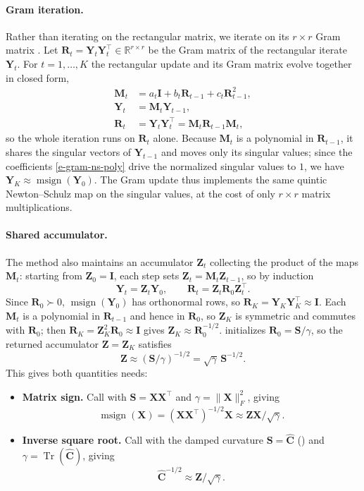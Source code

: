 \documentclass{article}
\newcommand{\mat}[1]{\bm{#1}}
\DeclareMathOperator{\Tr}{Tr}
\DeclareMathOperator{\msign}{msign}          %
\newcommand{\norm}[1]{\| #1\|}
\begin{document}
\paragraph{Gram iteration.}
Rather than iterating on the rectangular matrix, we iterate on its $r\times r$
Gram matrix \cite{gram_ns}.  Let $\mat{R}_t = \mat{Y}_t \mat{Y}_t^\top \in \mathbb{R}^{r\times r}$
be the Gram matrix of the rectangular iterate $\mat{Y}_t$.  For $t=1,\dots,K$ the
rectangular update and its Gram matrix evolve together in closed form,
\[
\begin{aligned}
    \mat{M}_t &= a_t \mat{I} + b_t \mat{R}_{t-1} + c_t \mat{R}_{t-1}^2, \\
    \mat{Y}_t &= \mat{M}_t \mat{Y}_{t-1}, \\
    \mat{R}_t &= \mat{Y}_t\mat{Y}_t^\top = \mat{M}_t \mat{R}_{t-1} \mat{M}_t ,
\end{aligned}
\]
so the whole iteration runs on $\mat{R}_t$ alone.  Because $\mat{M}_t$ is a polynomial in
$\mat{R}_{t-1}$, it shares the singular vectors of $\mat{Y}_{t-1}$ and moves only its
singular values; since the coefficients \eqref{e-gram-ns-poly} drive the
normalized singular values to $1$, we have $\mat{Y}_K \approx \msign(\mat{Y}_0)$.  The Gram update thus
implements the same quintic Newton--Schulz map on the singular values, at the
cost of only $r\times r$ matrix multiplications.

\paragraph{Shared accumulator.}
The method also maintains an accumulator $\mat{Z}_t$ collecting the product of the
maps $\mat{M}_t$: starting from $\mat{Z}_0=\mat{I}$, each step sets $\mat{Z}_t=\mat{M}_t \mat{Z}_{t-1}$, so by
induction
\[
    \mat{Y}_t=\mat{Z}_t\mat{Y}_0,
    \qquad
    \mat{R}_t=\mat{Z}_t\mat{R}_0\mat{Z}_t^\top .
\]
Since $\mat{R}_0\succ0$, $\msign(\mat{Y}_0)$ has orthonormal rows, so
$\mat{R}_K=\mat{Y}_K\mat{Y}_K^\top\approx \mat{I}$.  Each $\mat{M}_t$ is a polynomial in $\mat{R}_{t-1}$ and
hence in $\mat{R}_0$, so $\mat{Z}_K$ is symmetric and commutes with $\mat{R}_0$; then
$\mat{R}_K=\mat{Z}_K^2\mat{R}_0\approx \mat{I}$ gives $\mat{Z}_K\approx \mat{R}_0^{-1/2}$.
 initializes $\mat{R}_0=\mat{S}/\gamma$, so the returned accumulator
$\mat{Z}=\mat{Z}_K$ satisfies
\[
    \mat{Z}\approx(\mat{S}/\gamma)^{-1/2}=\sqrt{\gamma}\,\mat{S}^{-1/2}.
\]
This gives both quantities  needs:

\begin{itemize}[leftmargin=1.5em,itemsep=2pt,topsep=2pt]
    \item \textbf{Matrix sign.}
    Call  with $\mat{S}=\mat{X}\mat{X}^\top$ and $\gamma=\norm{\mat{X}}_F^2$, giving
    \[
        \msign(\mat{X})=(\mat{X}\mat{X}^\top)^{-1/2}\mat{X}\approx \mat{Z}\mat{X}/\sqrt{\gamma}.
    \]
    \item \textbf{Inverse square root.}
    Call  with the damped curvature $\mat{S}=\widehat{\mat{C}}$
    () and $\gamma=\Tr(\widehat{\mat{C}})$, giving
    \[
        \widehat{\mat{C}}^{-1/2}\approx \mat{Z}/\sqrt{\gamma}.
    \]
\end{itemize}
\end{document}
